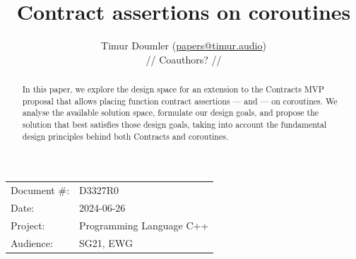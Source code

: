 

 \usepackage[bottom]{footmisc} 

 \usepackage{longtable}


\usepackage{tikz,lipsum,lmodern}
\usepackage[most]{tcolorbox}




\title{Contract assertions on coroutines}
\author{ Timur Doumler \small(\href{mailto:papers@timur.audio}{papers@timur.audio}) \\
// Coauthors? //
}
\date{}
\maketitle

\begin{tabular}{ll}
Document \#: & D3327R0 \\
Date: &2024-06-26 \\
Project: & Programming Language C++ \\
Audience: & SG21, EWG
\end{tabular}

\begin{abstract}
In this paper, we explore the design space for an extension to the Contracts MVP proposal \cite{P2900R8} that allows placing function contract assertions ---  and 
 --- on coroutines. We analyse the available solution space, formulate our design goals, and propose the solution that best satisfies those design goals, taking into account the fundamental design principles behind both Contracts and coroutines.
\end{abstract}




